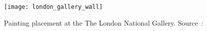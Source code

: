 \begin{figure}
    \texttt{[image: london\_gallery\_wall]}
    \caption[Painting placement at the The London National Gallery]{Painting placement at the The London National Gallery. Source~\cite{ScreenshotWallGoogle}:}
    \label{fig:london-wall}
\end{figure}





